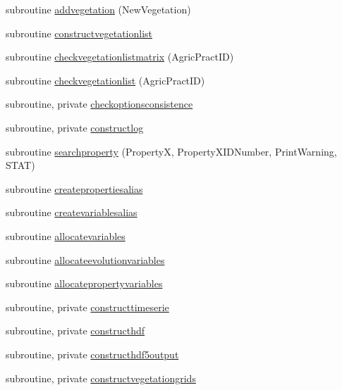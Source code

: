 \begin{DoxyCompactItemize}
\item 
subroutine \mbox{\hyperlink{namespacemodulevegetation_ad22b2fa6cec4ffe4f2464f02624beca6}{addvegetation}} (New\+Vegetation)
\item 
subroutine \mbox{\hyperlink{namespacemodulevegetation_a73de44a26d2dff28225fc8df134023fc}{constructvegetationlist}}
\item 
subroutine \mbox{\hyperlink{namespacemodulevegetation_a487744668471d5e49ad9df7d7686866e}{checkvegetationlistmatrix}} (Agric\+Pract\+ID)
\item 
subroutine \mbox{\hyperlink{namespacemodulevegetation_a5a2c8672adf25c28f58c08cd7f76e1c6}{checkvegetationlist}} (Agric\+Pract\+ID)
\item 
subroutine, private \mbox{\hyperlink{namespacemodulevegetation_a0b1feb4dec9ae87423940f66f7c66f76}{checkoptionsconsistence}}
\item 
subroutine, private \mbox{\hyperlink{namespacemodulevegetation_a9159b405f988e18f1d5dda447ae2525d}{constructlog}}
\item 
subroutine \mbox{\hyperlink{namespacemodulevegetation_aaa44ba5345b19bc2d7499a1e5643a52e}{searchproperty}} (PropertyX, Property\+X\+I\+D\+Number, Print\+Warning, S\+T\+AT)
\item 
subroutine \mbox{\hyperlink{namespacemodulevegetation_a6aff1147d516330fb474cb37975e7075}{createpropertiesalias}}
\item 
subroutine \mbox{\hyperlink{namespacemodulevegetation_ae10e09bee209b569a0f021506b4bbf27}{createvariablesalias}}
\item 
subroutine \mbox{\hyperlink{namespacemodulevegetation_a676fd58a37b84d4c65395b662dd8f0c6}{allocatevariables}}
\item 
subroutine \mbox{\hyperlink{namespacemodulevegetation_a1a48067359829dcfe9c8335991ba78cc}{allocateevolutionvariables}}
\item 
subroutine \mbox{\hyperlink{namespacemodulevegetation_a510aa5d26336e50f405ca27491ba7996}{allocatepropertyvariables}}
\item 
subroutine, private \mbox{\hyperlink{namespacemodulevegetation_ada5193380c49212dfdc1293861c924a0}{constructtimeserie}}
\item 
subroutine, private \mbox{\hyperlink{namespacemodulevegetation_a12974a55f8580bce1b17db7e139d7955}{constructhdf}}
\item 
subroutine, private \mbox{\hyperlink{namespacemodulevegetation_a687f37b7582103fd8a3308f5602b635f}{constructhdf5output}}
\item 
subroutine, private \mbox{\hyperlink{namespacemodulevegetation_a244fa0ac53269288775789c370d4ef6e}{constructvegetationgrids}}

\end{DoxyCompactItemize}
